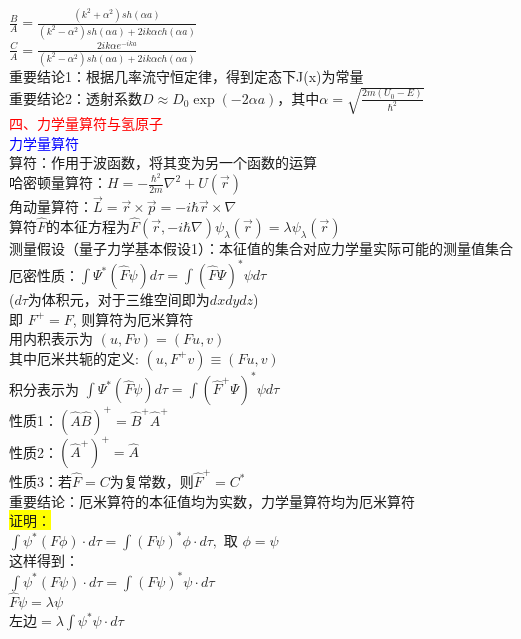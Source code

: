 \documentclass[a4paper,8pt]{extarticle} %
\newcommand{\bluetext}[1]{\textcolor{blue}{#1}}
\newcommand{\redtext}[1]{\textcolor{red}{#1}}
\newcommand{\yellowback}[1]{\colorbox{yellow}{#1}}
\begin{document}
\begin{multicols}{3}
$\frac{B}{A}=\frac{(k^2+\alpha^2)sh(\alpha a)}{(k^2-\alpha^2)sh(\alpha a)+2ik\alpha ch(\alpha a)}$\\
$\frac{C}{A}=\frac{2ik\alpha e^{-ika}}{(k^2-\alpha^2)sh(\alpha a)+2ik\alpha ch(\alpha a)}$\\
重要结论1：根据几率流守恒定律，得到定态下J(x)为常量\\
重要结论2：透射系数$D \approx D_0\exp(-2\alpha a)$，其中$\alpha = \sqrt{\frac{2m(U_0-E)}{\hbar^2}}$\\
\redtext{四、力学量算符与氢原子}\\
\bluetext{力学量算符}\\
算符：作用于波函数，将其变为另一个函数的运算\\
哈密顿量算符：$H = -\frac{\hbar^2}{2m}\nabla^2 + U(\vec{r})$\\
角动量算符：$\vec{L} = \vec{r}\times\vec{p} = -i\hbar\vec{r}\times\nabla$\\
算符$\hat{F}$的本征方程为$\hat{F}(\vec{r}, -i\hbar\nabla)\psi_\lambda(\vec{r}) = \lambda\psi_\lambda(\vec{r})$\\
测量假设（量子力学基本假设1）：本征值的集合对应力学量实际可能的测量值集合\\
厄密性质：$\int\Psi^*(\hat{F}\psi) d\tau = \int(\hat{F}\Psi)^*\psi d\tau$\\
($d\tau$为体积元，对于三维空间即为$dxdydz$)\\
即 $F^+ = F$, 则算符为厄米算符\\
用内积表示为 $(u,Fv) = (Fu,v)$\\
其中厄米共轭的定义: $(u,F^{+}v) \equiv (Fu,v)$ \\
积分表示为 $\int\Psi^*(\hat{F}\psi) d\tau = \int(\hat{F}^{+}\Psi)^*\psi d\tau$\\
性质1：$(\hat{A}\hat{B})^{+}= \hat{B}^{+}\hat{A}^{+}$\\
性质2：$(\hat{A}^{+})^{+} = \hat{A}$\\
性质3：若$\hat{F}=C$为复常数，则$\hat{F}^{+}=C^{*}$\\
重要结论：厄米算符的本征值均为实数，力学量算符均为厄米算符\\
\yellowback{证明：}\\
$\int \psi^*(F\phi)\cdot d\tau = \int (F\psi)^*\phi\cdot d\tau, \text{ 取 }\phi=\psi$\\
这样得到：\\
$\int \psi^*(F\psi)\cdot d\tau = \int (F\psi)^*\psi\cdot d\tau$\\
$\hat{F}\psi = \lambda\psi$\\
$\text{左边} = \lambda\int \psi^*\psi\cdot d\tau$

\end{multicols}
\end{document}
